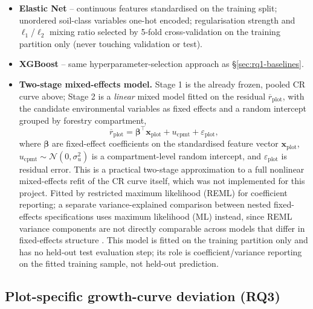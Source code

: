 \begin{itemize}
\setlength\itemsep{0pt}
\item \textbf{Elastic Net} -- continuous features standardised on the training split; unordered
  soil-class variables one-hot encoded; regularisation strength and $\ell_1$/$\ell_2$ mixing
  ratio selected by 5-fold cross-validation on the training partition only (never touching
  validation or test).
\item \textbf{XGBoost} -- same hyperparameter-selection approach as \S\ref{sec:rq1-baselines}.
\item \textbf{Two-stage mixed-effects model.} Stage 1 is the already frozen, pooled CR curve
  above; Stage 2 is a \emph{linear} mixed model fitted on the residual $\overline{r}_{\text{plot}}$,
  with the candidate environmental variables as fixed effects and a random intercept grouped by
  forestry compartment,
  \begin{equation}
  \overline{r}_{\text{plot}} = \boldsymbol{\beta}^{\top}\mathbf{x}_{\text{plot}} +
  u_{\text{cpmt}} + \varepsilon_{\text{plot}},
  \label{eq:mixed-effects}
  \end{equation}
  where $\boldsymbol{\beta}$ are fixed-effect coefficients on the standardised feature vector
  $\mathbf{x}_{\text{plot}}$, $u_{\text{cpmt}}\sim\mathcal{N}(0,\sigma_u^2)$ is a compartment-level
  random intercept, and $\varepsilon_{\text{plot}}$ is residual error. This is a practical
  two-stage approximation to a full nonlinear mixed-effects refit of the CR curve itself, which
  was not implemented for this project. Fitted by restricted maximum likelihood (REML) for
  coefficient reporting; a separate variance-explained comparison between nested fixed-effects
  specifications uses maximum likelihood (ML) instead, since REML variance components are not
  directly comparable across models that differ in fixed-effects structure
  \citep{pinheiro2000}. %
  This model is fitted on the training partition only and has no held-out test evaluation step;
  its role is coefficient/variance reporting on the fitted training sample, not held-out
  prediction.
\end{itemize}

\subsection{Plot-specific growth-curve deviation (RQ3)}
\label{sec:rq3}

